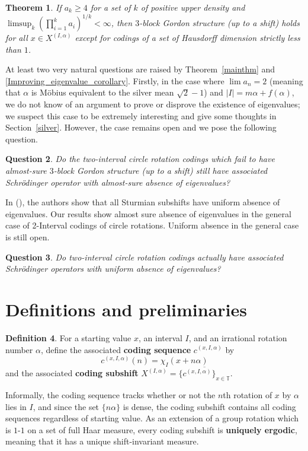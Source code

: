 \documentclass[11pt,reqno]{amsart}
\newtheorem{theorem}{Theorem}[section]
\newtheorem{question}[theorem]{Question}
\theoremstyle{definition}
\newtheorem{definition}[theorem]{Definition}
\theoremstyle{plain}
\begin{document}
\begin{theorem}\label{HD}
If $a_k \geq 4$ for a set of $k$ of positive upper density and $\limsup_k \left(\prod_{i=1}^k a_i\right)^{1/k} < \infty$, then $3$-block Gordon structure (up to a shift) holds for all $x \in X^{(I,\alpha)}$ except for codings of a set 
of Hausdorff dimension strictly less than $1$.
\end{theorem}



At least two very natural questions are raised by Theorem~\ref{mainthm} and \cref{Improving_eigenvalue_corollary}. Firstly, in the case where $\lim a_n = 2$ (meaning that $\alpha$ is M\"{o}bius equivalent to the silver mean $\sqrt{2} - 1$) and $|I| = m\alpha + f(\alpha)$, we do not know of an argument to prove or disprove the existence of eigenvalues; we suspect this case to be extremely interesting and give some thoughts in Section~\ref{silver}. However, the case remains open and we pose the following question.

\begin{question}
Do the two-interval circle rotation codings which fail to have almost-sure $3$-block Gordon structure (up to a shift) still have associated Schr\"{o}dinger operator with almost-sure absence of eigenvalues?
\end{question}

In (\cite{sturm}), the authors show that all Sturmian subshifts have uniform absence of eigenvalues. Our results show almost sure absence of eigenvalues in the general case of 2-Interval codings of circle rotations. Uniform absence in the general case is still open.

\begin{question}
Do two-interval circle rotation codings actually have associated Schr\"{o}dinger operators with uniform absence of eigenvalues?
\end{question}


\section{Definitions and preliminaries}\label{sec:defs}
\begin{definition}
For a starting value $x$, an interval $I$, and an irrational rotation number $\alpha$, define the associated \textbf{coding sequence} $c^{(x,I,\alpha)}$ by
\[
c^{(x,I,\alpha)}(n) = \chi_I(x + n\alpha)
\]
and the associated \textbf{coding subshift} $X^{(I,\alpha)} = \overline{\{c^{(x,I,\alpha)}\}_{x \in \mathbb{T}}}$.
\end{definition}
Informally, the coding sequence tracks whether or not the $n$th rotation of $x$ by $\alpha$ lies in $I$, and since the set $\{n\alpha\}$ is dense, the coding subshift contains all coding sequences regardless of starting value. As an extension of a group rotation which is $1$-$1$ on a set of full Haar measure, every coding subshift is \textbf{uniquely ergodic}, meaning that it has a unique shift-invariant measure.
\end{document}
